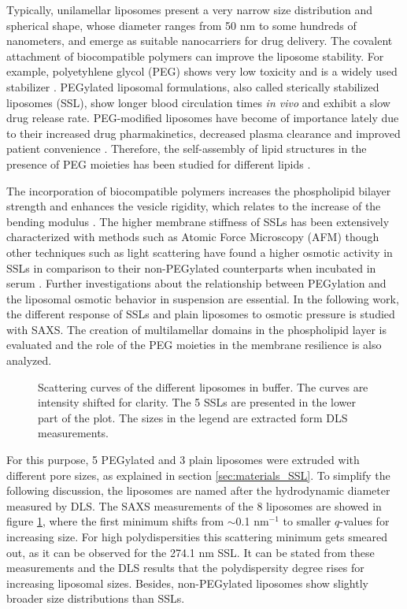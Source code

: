Typically, unilamellar liposomes present a very narrow size distribution and spherical shape, whose diameter ranges from 50 nm to some hundreds of nanometers, and emerge as suitable nanocarriers for drug delivery. The covalent attachment of biocompatible polymers can improve the liposome stability. For example, polyetyhlene glycol (PEG) shows very low toxicity \cite{yamaoka_distribution_1994} and is a widely used stabilizer \cite{sou_polyethylene_2000}. PEGylated liposomal formulations, also called sterically stabilized liposomes (SSL), show longer blood circulation times \emph{in vivo} \cite{barenholz_liposome_2001} and exhibit a slow drug release rate. PEG-modified liposomes have become of importance lately due to their increased drug pharmakinetics, decreased plasma clearance and improved patient convenience \cite{gabizon_polyethylene_1997,harris_effect_2003}. Therefore, the self-assembly of lipid structures in the presence of PEG moieties has been studied for different lipids \cite{lee_coarse-grained_2011}.

The incorporation of biocompatible polymers increases the phospholipid bilayer strength and enhances the vesicle rigidity, which relates to the increase of the bending modulus \cite{liang_effect_2005, sou_polyethylene_2000}. The higher membrane stiffness of SSLs has been extensively characterized with methods such as Atomic Force Microscopy (AFM) \cite{spyratou_atomic_2009} though other techniques such as light scattering have found a higher osmotic activity in SSLs in comparison to their non-PEGylated counterparts when incubated in serum \cite{wolfram_shrinkage_2014}. Further investigations about the relationship between PEGylation and the liposomal osmotic behavior in suspension are essential. In the following work, the different response of SSLs and plain liposomes to osmotic pressure is studied with SAXS. The creation of multilamellar domains in the phospholipid layer is evaluated and the role of the PEG moieties in the membrane resilience is also analyzed.

\begin{figure}
	\centering
		
		\caption{Scattering curves of the different liposomes in buffer. The curves are intensity shifted for clarity. The 5 SSLs are presented in the lower part of the plot. The sizes in the legend are extracted form DLS measurements.}
		\label{fig:SSLSingleContrast}
\end{figure}

For this purpose, 5 PEGylated and 3 plain liposomes were extruded with different pore sizes, as explained in section \ref{sec:materials_SSL}. To simplify the following discussion, the liposomes are named after the hydrodynamic diameter measured by DLS. The SAXS measurements of the 8 liposomes are showed in figure \ref{fig:SSLSingleContrast}, where the first minimum shifts from $\sim$0.1 nm$^{-1}$ to smaller $q$-values for increasing size. For high polydispersities this scattering minimum gets smeared out, as it can be observed for the 274.1 nm SSL. It can be stated from these measurements and the DLS results that the polydispersity degree rises for increasing liposomal sizes. Besides, non-PEGylated liposomes show slightly broader size distributions than SSLs.

